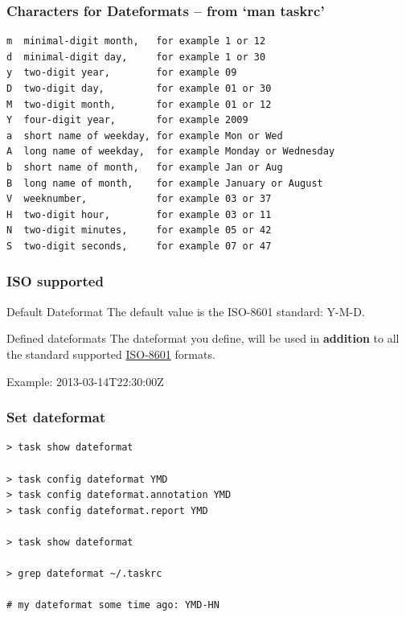 \documentclass[t,handout,aspectratio=169]{beamer}
\begin{document}
\begin{frame}[fragile]\frametitle{Characters for Dateformats -- from `man taskrc'}
    \vfill
    \begin{lstlisting}
m  minimal-digit month,   for example 1 or 12
d  minimal-digit day,     for example 1 or 30
y  two-digit year,        for example 09
D  two-digit day,         for example 01 or 30
M  two-digit month,       for example 01 or 12
Y  four-digit year,       for example 2009
a  short name of weekday, for example Mon or Wed
A  long name of weekday,  for example Monday or Wednesday
b  short name of month,   for example Jan or Aug
B  long name of month,    for example January or August
V  weeknumber,            for example 03 or 37
H  two-digit hour,        for example 03 or 11
N  two-digit minutes,     for example 05 or 42
S  two-digit seconds,     for example 07 or 47\end{lstlisting}
\end{frame}

\begin{frame}[fragile]\frametitle{ISO supported}
    \vfill
    \begin{exampleblock}{Default Dateformat}
        The default value is the ISO-8601 standard: Y-M-D.
    \end{exampleblock} \pause
    \vfill
    \begin{alertblock}{Defined dateformats}
        The dateformat you define, will be used in \textbf{addition} to all the standard supported \href{https://en.wikipedia.org/wiki/ISO_8601}{ISO-8601} formats.

        Example: 2013-03-14T22:30:00Z
    \end{alertblock}
\end{frame}

\begin{frame}[fragile]\frametitle{Set dateformat}
    \vfill
    \begin{lstlisting}
> task show dateformat

> task config dateformat YMD
> task config dateformat.annotation YMD
> task config dateformat.report YMD

> task show dateformat

> grep dateformat ~/.taskrc

# my dateformat some time ago: YMD-HN\end{lstlisting}
\end{frame}
\end{document}
